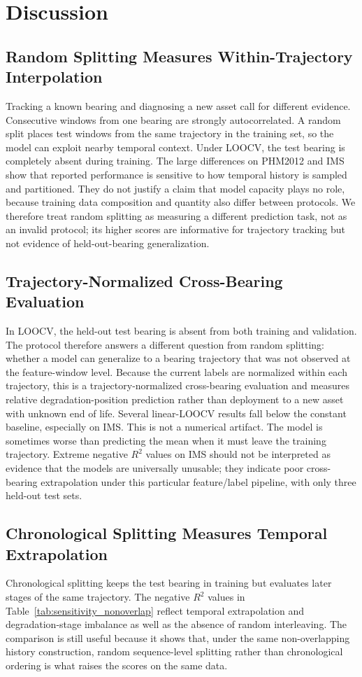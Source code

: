 \documentclass[pdflatex,sn-basic,NameDate]{sn-jnl}
\begin{document}
\section{Discussion}
\subsection{Random Splitting Measures Within-Trajectory Interpolation}
Tracking a known bearing and diagnosing a new asset call for different evidence. Consecutive windows from one bearing are strongly autocorrelated. A random split places test windows from the same trajectory in the training set, so the model can exploit nearby temporal context. Under LOOCV, the test bearing is completely absent during training. The large differences on PHM2012 and IMS show that reported performance is sensitive to how temporal history is sampled and partitioned. They do not justify a claim that model capacity plays no role, because training data composition and quantity also differ between protocols.
We therefore treat random splitting as measuring a different prediction task, not as an invalid protocol; its higher scores are informative for trajectory tracking but not evidence of held-out-bearing generalization.

\subsection{Trajectory-Normalized Cross-Bearing Evaluation}
In LOOCV, the held-out test bearing is absent from both training and validation. The protocol therefore answers a different question from random splitting: whether a model can generalize to a bearing trajectory that was not observed at the feature-window level. Because the current labels are normalized within each trajectory, this is a trajectory-normalized cross-bearing evaluation and measures relative degradation-position prediction rather than deployment to a new asset with unknown end of life. Several linear-LOOCV results fall below the constant baseline, especially on IMS. This is not a numerical artifact. The model is sometimes worse than predicting the mean when it must leave the training trajectory.
Extreme negative $R^2$ values on IMS should not be interpreted as evidence that the models are universally unusable; they indicate poor cross-bearing extrapolation under this particular feature/label pipeline, with only three held-out test sets.

\subsection{Chronological Splitting Measures Temporal Extrapolation}
Chronological splitting keeps the test bearing in training but evaluates later stages of the same trajectory. The negative $R^2$ values in Table~\ref{tab:sensitivity_nonoverlap} reflect temporal extrapolation and degradation-stage imbalance as well as the absence of random interleaving. The comparison is still useful because it shows that, under the same non-overlapping history construction, random sequence-level splitting rather than chronological ordering is what raises the scores on the same data.
\end{document}
